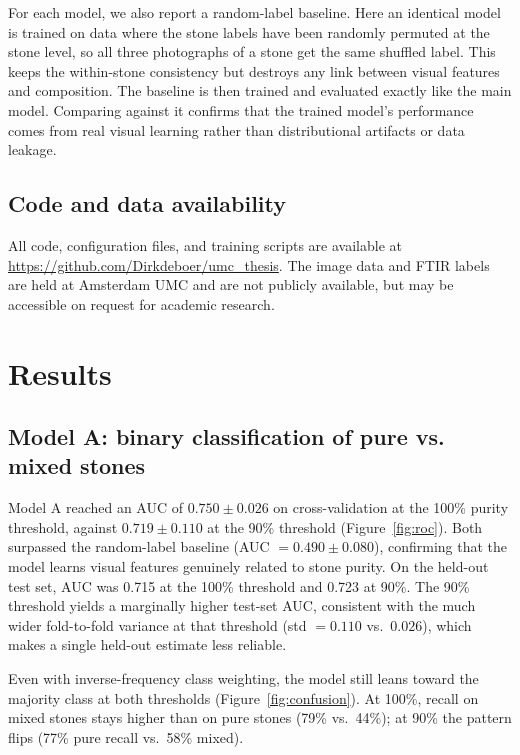 \documentclass[10pt,twocolumn]{article}
\begin{document}
For each model, we also report a random-label baseline. Here an identical model is trained on data where the stone labels have been randomly permuted at the stone level, so all three photographs of a stone get the same shuffled label. This keeps the within-stone consistency but destroys any link between visual features and composition. The baseline is then trained and evaluated exactly like the main model. Comparing against it confirms that the trained model's performance comes from real visual learning rather than distributional artifacts or data leakage.

\subsection*{Code and data availability}

All code, configuration files, and training scripts are available at \url{https://github.com/Dirkdeboer/umc_thesis}. The image data and FTIR labels are held at Amsterdam UMC and are not publicly available, but may be accessible on request for academic research.

\section*{Results}

\subsection*{Model A: binary classification of pure vs. mixed stones}

Model A reached an AUC of $0.750 \pm 0.026$ on cross-validation at the 100\% purity threshold, against $0.719 \pm 0.110$ at the 90\% threshold (Figure~\ref{fig:roc}). Both surpassed the random-label baseline (AUC $= 0.490 \pm 0.080$), confirming that the model learns visual features genuinely related to stone purity. On the held-out test set, AUC was 0.715 at the 100\% threshold and 0.723 at 90\%. The 90\% threshold yields a marginally higher test-set AUC, consistent with the much wider fold-to-fold variance at that threshold (std $= 0.110$ vs.\ $0.026$), which makes a single held-out estimate less reliable.

Even with inverse-frequency class weighting, the model still leans toward the majority class at both thresholds (Figure~\ref{fig:confusion}). At 100\%, recall on mixed stones stays higher than on pure stones (79\% vs.\ 44\%); at 90\% the pattern flips (77\% pure recall vs.\ 58\% mixed).
\end{document}
